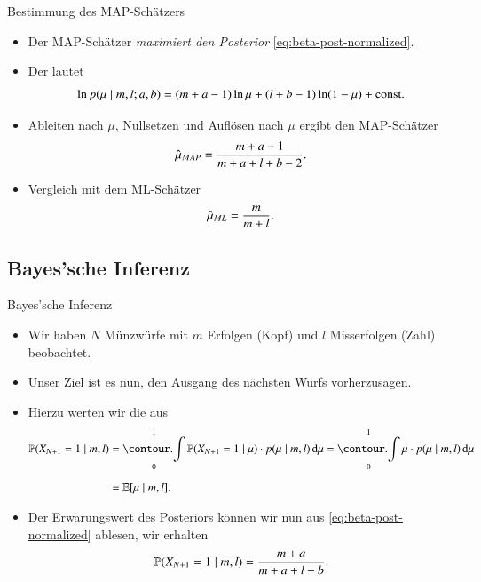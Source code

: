 \begin{frame}{Bestimmung des MAP-Schätzers}{}
	\begin{itemize}
		\item Der MAP-Schätzer \textit{maximiert den Posterior} \eqref{eq:beta-post-normalized}.
		\item Der  lautet
		\begin{equation*}
			\ln p( \mu \mid m, l; a, b) = (m + a - 1) \ln \mu + (l + b - 1) \ln (1 - \mu) + \text{const}.
		\end{equation*}
		\item Ableiten nach $\mu$, Nullsetzen und Auflösen nach $\mu$ ergibt den MAP-Schätzer
		\begin{equation*}
			\hat{\mu}_{MAP} = \frac{m + a - 1}{m + a + l + b - 2}.
		\end{equation*}
		\item Vergleich mit dem ML-Schätzer
		\begin{equation*}
			\hat{\mu}_{ML} = \frac{m}{m + l}.
		\end{equation*}
	\end{itemize}
\end{frame}


\subsection{Bayes'sche Inferenz}

\begin{frame}{Bayes'sche Inferenz}{}
	\begin{itemize}
		\item Wir haben $N$ Münzwürfe mit $m$ Erfolgen (Kopf) und $l$ Misserfolgen (Zahl) beobachtet.
		\item Unser Ziel ist es nun, den Ausgang des nächsten Wurfs vorherzusagen.
		\item Hierzu werten wir die  aus
		\begin{align*}
			\Prob(X_{N+1} = 1 \mid m, l)
				&= \int_0^1 \Prob(X_{N+1} = 1 \mid \mu) \cdot p(\mu \mid m, l)\,\diff\mu
					= \int_0^1 \mu \cdot p(\mu \mid m, l)\,\diff\mu
		\\[2mm]
				&= \E[\mu \mid m, l].
		\end{align*}
		\item Der Erwarungswert des Posteriors können wir nun aus \eqref{eq:beta-post-normalized} ablesen, wir erhalten
		\begin{equation*}
			\mathbb{P}(X_{N+1} = 1 \mid m, l) = \frac{m + a}{m + a + l + b}.
		\end{equation*}
	\end{itemize}
\end{frame}